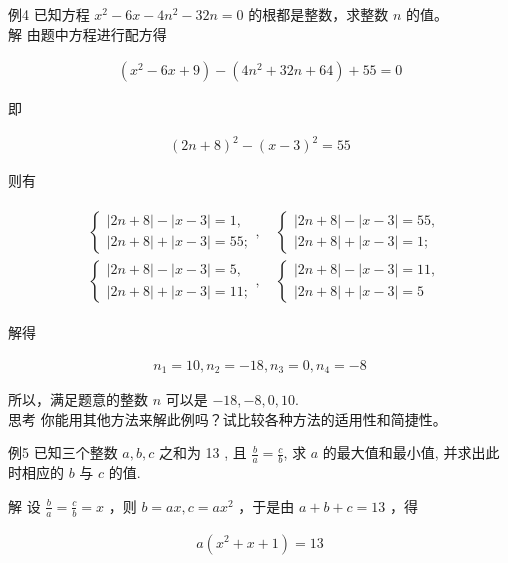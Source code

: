 \documentclass[10pt]{article}
\begin{document}
例4 已知方程 $x^{2}-6 x-4 n^{2}-32 n=0$ 的根都是整数，求整数 $n$ 的值。\\
解 由题中方程进行配方得

\begin{align*}
\left(x^{2}-6 x+9\right)-\left(4 n^{2}+32 n+64\right)+55=0
\end{align*}

即

\begin{align*}
(2 n+8)^{2}-(x-3)^{2}=55
\end{align*}

则有

\begin{align*}
\begin{aligned}
& \left\{\begin{array}{l}
|2 n+8|-|x-3|=1, \\
|2 n+8|+|x-3|=55 ;
\end{array}, \quad\left\{\begin{array}{l}
|2 n+8|-|x-3|=55, \\
|2 n+8|+|x-3|=1 ;
\end{array}\right.\right. \\
& \left\{\begin{array}{l}
|2 n+8|-|x-3|=5, \\
|2 n+8|+|x-3|=11 ;
\end{array}, \quad\left\{\begin{array}{l}
|2 n+8|-|x-3|=11, \\
|2 n+8|+|x-3|=5
\end{array}\right.\right.
\end{aligned}
\end{align*}

解得

\begin{align*}
n_{1}=10, n_{2}=-18, n_{3}=0, n_{4}=-8
\end{align*}

所以，满足题意的整数 $n$ 可以是 $-18,-8,0,10$.\\
思考 你能用其他方法来解此例吗？试比较各种方法的适用性和简捷性。

例5 已知三个整数 $a, b, c$ 之和为 13 , 且 $\frac{b}{a}=\frac{c}{b}$, 求 $a$ 的最大值和最小值, 并求出此时相应的 $b$ 与 $c$ 的值.

解 设 $\frac{b}{a}=\frac{c}{b}=x$ ，则 $b=a x, c=a x^{2}$ ，于是由 $a+b+c=13$ ，得

\begin{align*}
a\left(x^{2}+x+1\right)=13
\end{align*}
\end{document}
